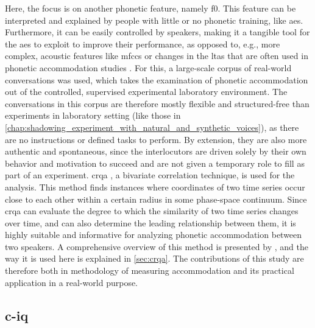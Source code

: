 Here, the focus is on another phonetic feature, namely \ac{f0}.
This feature can be interpreted and explained by people with little or no phonetic training, like \acp{ae}.
Furthermore, it can be easily controlled by speakers, making it a tangible tool for the \acp{ae} to exploit to improve their performance, as opposed to, e.g., more complex, acoustic features like \acp{mfcc} or changes in the \ac{ltas} that are often used in phonetic accommodation studies \citep{Levitan2011measuring, Borrie2019syncing}.
For this, a large-scale corpus of real-world conversations was used, which takes the examination of phonetic accommodation out of the controlled, supervised experimental laboratory environment.
The conversations in this corpus are therefore mostly flexible and structured-free than experiments in laboratory setting (like those in \cref{chap:shadowing_experiment_with_natural_and_synthetic_voices}), as there are no instructions or defined tasks to perform.
By extension, they are also more authentic and spontaneous, since the interlocutors are driven solely by their own behavior and motivation to succeed and are not given a temporary role to fill as part of an experiment.
\Ac{crqa} \citep{Zbilut1998detecting}, a bivariate correlation technique, is used for the analysis.
This method finds instances where coordinates of two time series occur close to each other within a certain radius in some phase-space continuum.
Since \ac{crqa} can evaluate the degree to which the similarity of two time series changes over time, and can also determine the leading relationship between them, it is highly suitable and informative for analyzing phonetic accommodation between two speakers.
A comprehensive overview of this method is presented by \citet{Wallot2018analyzing}, and the way it is used here is explained in \cref{sec:crqa}.
The contributions of this study are therefore both in methodology of measuring accommodation and its practical application in a real-world purpose.

\subsection{\Acl{c-iq}}
\label{subsec:conversation_intelligence}

